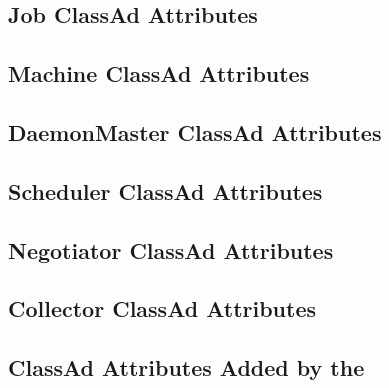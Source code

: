 \subsection*{\label{sec:Job-ClassAd-Attributes}Job ClassAd Attributes}


\subsection*{\label{sec:Machine-ClassAd-Attributes}Machine ClassAd Attributes}


\subsection*{\label{sec:DaemonMaster-ClassAd-Attributes}DaemonMaster ClassAd Attributes}


\subsection*{\label{sec:Scheduler-ClassAd-Attributes}Scheduler ClassAd Attributes}


\subsection*{\label{sec:Negotiator-ClassAd-Attributes}Negotiator ClassAd Attributes}


\subsection*{\label{sec:Collector-ClassAd-Attributes}Collector ClassAd Attributes}


\subsection*{\label{sec:Collector-Added-Attributes}ClassAd Attributes Added by the }

